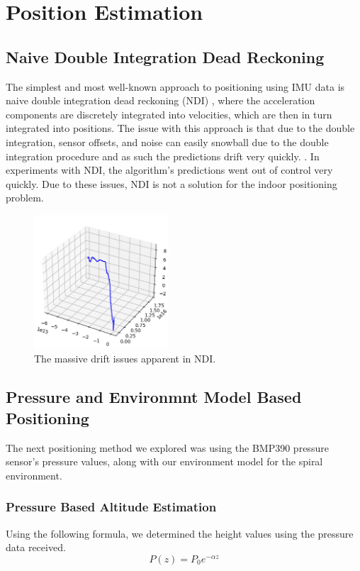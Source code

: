 \section{Position Estimation}
\subsection{Naive Double Integration Dead Reckoning}
The simplest and most well-known approach to positioning using IMU data is naive double integration dead reckoning (NDI) \cite{yan_2019_ronin}, where the acceleration components are discretely integrated into velocities, which are then in turn integrated into positions. The issue with this approach is that due to the double integration, sensor offsets, and noise can easily snowball due to the double integration procedure and as such the predictions drift very quickly. \cite{yan_2019_ronin}. In experiments with NDI, the algorithm's predictions went out of control very quickly. Due to these issues, NDI is not a solution for the indoor positioning problem.

\begin{figure}[h] 
	\centering \includegraphics[height=5cm]{./images/ndi.png}
	\caption{The massive drift issues apparent in NDI.}
\end{figure}

\subsection{Pressure and Environmnt Model Based Positioning}
The next positioning method we explored was using the BMP390 pressure sensor's pressure values, along with our environment model for the spiral environment.
\subsubsection{Pressure Based Altitude Estimation}
Using the following formula, we determined the height values using the pressure data received.
$$P\left(z\right)=P_0e^{-\alpha z}$$

